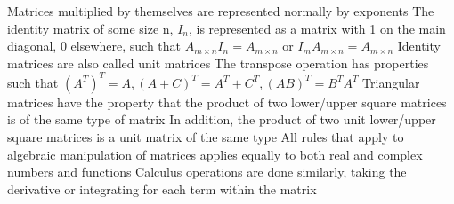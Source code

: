 \documentclass[11 pt, twoside]{article}
\newenvironment{outline*}
{
	\begin{outline}[enumerate]
	}
	{\end{outline}
}
\begin{document}
\begin{outline*}
\2 Matrices multiplied by themselves are represented normally by exponents
\1 The identity matrix of some size n, $I_n$, is represented as a matrix with 1 on the main diagonal, 0 elsewhere, such that $A_{m \times n}I_n = A_{m \times n}$ or $I_mA_{m \times n} = A_{m \times n}$
\2 Identity matrices are also called unit matrices
\1 The transpose operation has properties such that $(A^T)^T = A, (A + C)^T = A^T + C^T, (AB)^T = B^TA^T$
\1 Triangular matrices have the property that the product of two lower/upper square matrices is of the same type of matrix
\2 In addition, the product of two unit lower/upper square matrices is a unit matrix of the same type
\1 All rules that apply to algebraic manipulation of matrices applies equally to both real and complex numbers and functions
\2 Calculus operations are done similarly, taking the derivative or integrating for each term within the matrix
\end{outline*}
\end{document}
